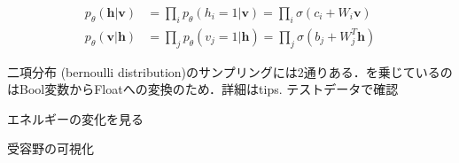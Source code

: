 \begin{align}
p_\theta(\mathbf{h}|\mathbf{v})&=\prod_i p_\theta(h_i=1|\mathbf{v})=\prod_i \sigma(c_i + W_i \mathbf{v})\\
p_\theta(\mathbf{v}|\mathbf{h})&=\prod_j p_\theta(v_j=1|\mathbf{h})=\prod_j \sigma(b_j + W_j^T \mathbf{h})
\end{align}

二項分布 (bernoulli distribution)のサンプリングには2通りある．を乗じているのはBool変数からFloatへの変換のため．詳細はtips.
テストデータで確認






エネルギーの変化を見る


受容野の可視化


